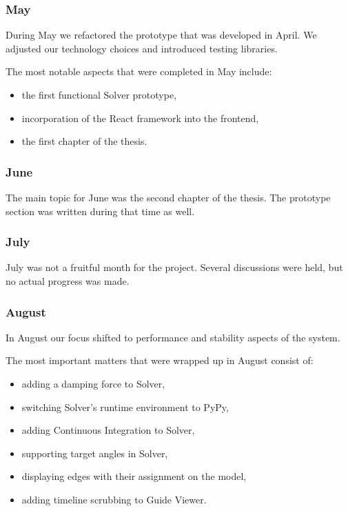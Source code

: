 
\subsubsection{May}

During May we refactored the prototype that was developed in April. We adjusted our technology choices and introduced testing libraries.

The most notable aspects that were completed in May include:

\begin{itemize}
	\item the first functional Solver prototype,
	\item incorporation of the React framework into the frontend,
	\item the first chapter of the thesis. 
\end{itemize}

\subsubsection{June}

The main topic for June was the second chapter of the thesis. The prototype section was written during that time as well.

\subsubsection{July}

July was not a fruitful month for the project. Several discussions were held, but no actual progress was made.

\subsubsection{August}

In August our focus shifted to performance and stability aspects of the system. 

The most important matters that were wrapped up in August consist of:

\begin{itemize}
	\item adding a damping force to Solver,
	\item switching Solver's runtime environment to PyPy,
	\item adding Continuous Integration to Solver,
	\item supporting target angles in Solver,
	\item displaying edges with their assignment on the model,
	\item adding timeline scrubbing to Guide Viewer.
\end{itemize}

